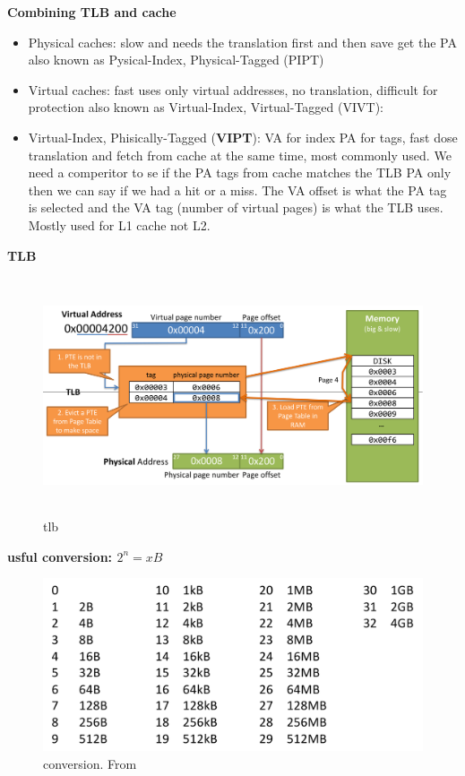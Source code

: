 \textbf{Combining TLB and cache}
\begin{itemize}
\item  Physical caches: slow and needs the translation first and then save get the PA
  also known as Pysical-Index, Physical-Tagged (PIPT)
\item  Virtual caches: fast uses only virtual addresses, no translation, difficult for protection
  also known as Virtual-Index, Virtual-Tagged (VIVT):
\item  Virtual-Index, Phisically-Tagged (\textbf{VIPT}): VA for index PA for tags, fast dose translation and
  fetch from cache at the same time, most commonly used.
  We need a comperitor to se if the PA tags from cache matches the TLB PA only then we can say if we had a hit or a miss.
  The VA offset is what the PA tag is selected and the VA tag (number of virtual pages) is what the TLB uses.
  Mostly used for L1 cache not L2.
\end{itemize}

\textbf{TLB}
\begin{figure}[H]
    \centering
    \includegraphics[width=16cm, height=7cm]{image/tlb.png}
    \caption{tlb}
\end{figure}


\textbf{usful conversion: $2^n=xB$}
\begin{figure}[H]
    \centering
    \includegraphics[width=16cm]{image/conversion.png}
    \caption{conversion. From \cite{ca}}
\end{figure}


